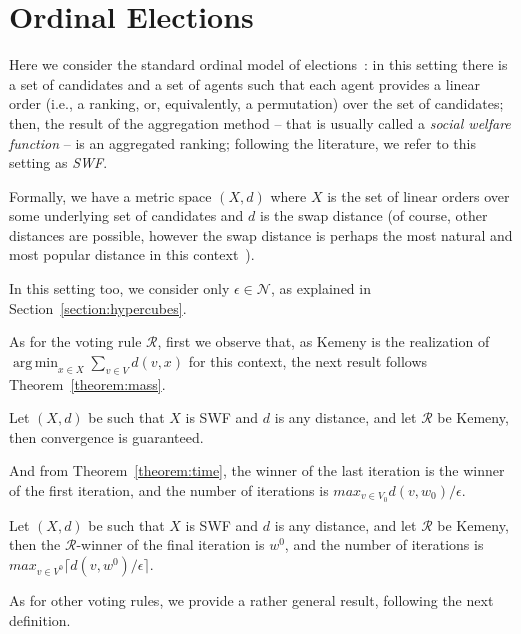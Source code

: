 \documentclass[runningheads,envcountsame]{llncs}
\DeclareMathOperator*{\argmin}{arg\,min}
\begin{document}
\section{Ordinal Elections}\label{section:ordinal}

Here we consider the standard ordinal model of elections~\cite{moulin2016handbook}:
  in this setting there is a set of candidates and a set of agents such that each agent provides a linear order (i.e., a ranking, or, equivalently, a permutation) over the set of candidates; then, the result of the aggregation method -- that is usually called a \emph{social welfare function} -- is an aggregated ranking; following the literature, we refer to this setting as \emph{SWF}.

Formally, we have a metric space $(X, d)$ where $X$ is the set of linear orders over some underlying set of candidates and $d$ is the swap distance (of course, other distances are possible, however the swap distance is perhaps the most natural and most popular distance in this context~\cite{hogrebe2019complexity,faliszewski2019similar,faliszewski2020isomorphic}). 

In this setting too, we consider only $\epsilon \in \mathcal{N}$, as explained in Section~\ref{section:hypercubes}.

As for the voting rule $\mathcal{R}$, first we observe that, 
as Kemeny is the realization of $\argmin_{x \in X} \sum_{v \in V} d(v, x)$ for this context, the next result follows Theorem~\ref{theorem:mass}.

\begin{corollary}\label{theorem:kemeny}
  Let $(X, d)$ be such that $X$ is SWF and $d$ is any distance, and let $\mathcal{R}$ be Kemeny, then convergence is guaranteed.
\end{corollary}

And from Theorem~\ref{theorem:time}, the winner of the last iteration is the winner of the first iteration, and the number of iterations is $max_{v \in V_0} d(v, w_0)/\epsilon$.

\begin{corollary}
  Let $(X, d)$ be such that $X$ is SWF and $d$ is any distance, and let $\mathcal{R}$ be Kemeny, then the $\mathcal{R}$-winner of the final iteration is $w^0$, and the number of iterations is $max_{v \in V^0} \lceil d(v, w^0)/\epsilon \rceil$.
\end{corollary}

As for other voting rules, we provide a rather general result, following the next definition.
\end{document}
